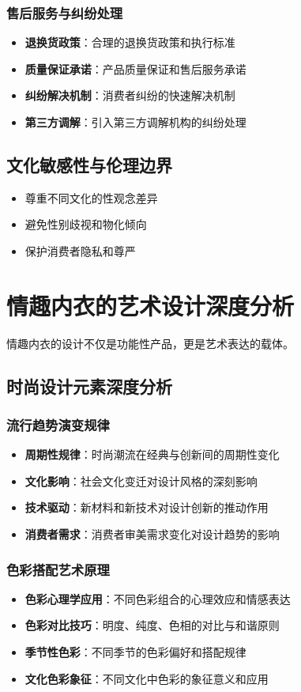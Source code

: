\documentclass[12pt,UTF8]{ctexbook}
\begin{document}
\subsubsection{售后服务与纠纷处理}
\begin{itemize}[leftmargin=2cm]
	\item \textbf{退换货政策}：合理的退换货政策和执行标准
	\item \textbf{质量保证承诺}：产品质量保证和售后服务承诺
	\item \textbf{纠纷解决机制}：消费者纠纷的快速解决机制
	\item \textbf{第三方调解}：引入第三方调解机构的纠纷处理
\end{itemize}

\subsection{文化敏感性与伦理边界}
\begin{itemize}[leftmargin=2cm]
	\item 尊重不同文化的性观念差异
	\item 避免性别歧视和物化倾向
	\item 保护消费者隐私和尊严
\end{itemize}

\section{情趣内衣的艺术设计深度分析}
情趣内衣的设计不仅是功能性产品，更是艺术表达的载体。

\subsection{时尚设计元素深度分析}
\subsubsection{流行趋势演变规律}
\begin{itemize}[leftmargin=2cm]
	\item \textbf{周期性规律}：时尚潮流在经典与创新间的周期性变化
	\item \textbf{文化影响}：社会文化变迁对设计风格的深刻影响
	\item \textbf{技术驱动}：新材料和新技术对设计创新的推动作用
	\item \textbf{消费者需求}：消费者审美需求变化对设计趋势的影响
\end{itemize}

\subsubsection{色彩搭配艺术原理}
\begin{itemize}[leftmargin=2cm]
	\item \textbf{色彩心理学应用}：不同色彩组合的心理效应和情感表达
	\item \textbf{色彩对比技巧}：明度、纯度、色相的对比与和谐原则
	\item \textbf{季节性色彩}：不同季节的色彩偏好和搭配规律
	\item \textbf{文化色彩象征}：不同文化中色彩的象征意义和应用
\end{itemize}
\end{document}
